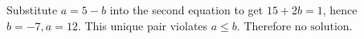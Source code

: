 Substitute $ a=5-b $ into the second equation to get $ 15+2b=1 $, hence $ b=-7,a=12 $. This unique pair violates $ a\le b $. Therefore $\boxed{\text{no solution}}$.
